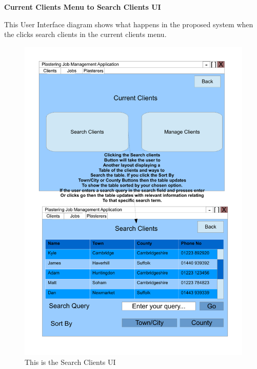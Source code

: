 \pagebreak
\textbf{Current Clients Menu to Search Clients UI}
\begin{flushleft}
This User Interface diagram shows what happens in the proposed system when the clicks search clients in the current clients menu.
\end{flushleft}
\begin{figure}[H]
\includegraphics[scale=0.5]{./Design/images/UI-SearchClients.pdf}
    \caption{This is the Search Clients UI} 
\label{fig:FlowChartNewClient}
\end{figure}


